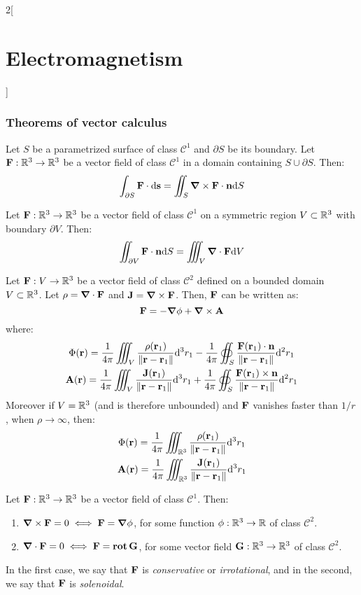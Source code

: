 \documentclass[../../../main.tex]{subfiles}
\begin{document}
\begin{multicols}{2}[\section{Electromagnetism}]
  \subsubsection{Theorems of vector calculus}
  \begin{theorem}
    Let $S$ be a parametrized surface of class $\mathcal{C}^1$ and $\partial S$ be its boundary. Let $\vf{F}:\RR^3\rightarrow\RR^3$ be a vector field of class $\mathcal{C}^1$ in a domain containing $S\cup\partial S$. Then: $$\int_{\partial S}\vf{F}\cdot \dd \vf{s}=\iint_S\rotp\vf{F}\cdot\vf{n} \dd S$$
  \end{theorem}
  \begin{theorem}
    Let $\vf{F}:\RR^3\rightarrow\RR^3$ be a vector field of class $\mathcal{C}^1$ on a symmetric region $V\subset\RR^3$ with boundary $\partial V$. Then: $$\iint_{\partial V}\vf{F}\cdot\vf{n} \dd S=\iiint_V\divp\vf{F}\dd V$$
  \end{theorem}
  \begin{theorem}
    Let $\vf{F}:V\rightarrow\RR^3$ be a vector field of class $\mathcal{C}^2$ defined on a bounded domain $V\subset\RR^3$. Let $\rho=\divp\vf{F}$ and $\vf{J}=\rotp\vf{F}$. Then, $\vf{F}$ can be written as: $$\vf{F}=-\grad\phi+\rotp\vf{A}$$
    where:
    \begin{gather*}
      \Phi(\vf{r}) =\frac 1 {4\pi} \iiint_V \frac{\rho(\vf{r}_1)}{\norm{\vf{r}-\vf{r}_1}}\dd^3r_1 -\frac 1 {4\pi} \oiint_S\frac{\vf{F} (\vf{r}_1)\cdot\vf{n}}{\norm{\vf{r}-\vf{r}_1}}\dd^2r_1\\
      \vf{A}(\vf{r}) =\frac 1 {4\pi} \iiint_V \frac{\vf{J}(\vf{r}_1)}{\norm{\vf{r}-\vf{r}_1}}\dd^3r_1 +\frac 1 {4\pi} \oiint_S \frac{\vf{F} (\vf{r}_1)\times\vf{n}}{\norm{\vf{r}-\vf{r}_1}}\dd^2r_1
    \end{gather*}
    Moreover if $V=\RR^3$ (and is therefore unbounded) and $\vf{F}$ vanishes faster than $1/r$, when $\rho\to\infty$, then:
    \begin{gather*}
      \Phi(\vf{r}) =\frac 1 {4\pi} \iiint_{\RR^3} \frac{\rho(\vf{r}_1)}{\norm{\vf{r}-\vf{r}_1}}\dd^3r_1 \\
      \vf{A}(\vf{r}) =\frac 1 {4\pi} \iiint_{\RR^3} \frac{\vf{J}(\vf{r}_1)}{\norm{\vf{r}-\vf{r}_1}}\dd^3r_1
    \end{gather*}
  \end{theorem}
  \begin{theorem}
    Let $\vf{F}:\RR^3\rightarrow\RR^3$ be a vector field of class $\mathcal{C}^1$. Then:
    \begin{enumerate}
      \item $\rotp\vf{F}=0\iff\vf{F}=\grad\phi$, for some function $\phi:\RR^3\rightarrow\RR$ of class $\mathcal{C}^2$.
      \item $\divp\vf{F}=0\iff\vf{F}=\rot\vf{G}$, for some vector field $\vf{G}:\RR^3\rightarrow\RR^3$ of class $\mathcal{C}^2$.
    \end{enumerate}
    In the first case, we say that $\vf{F}$ is \emph{conservative} or \emph{irrotational}, and in the second, we say that $\vf{F}$ is \emph{solenoidal}.
  \end{theorem}

\end{multicols}
\end{document}
